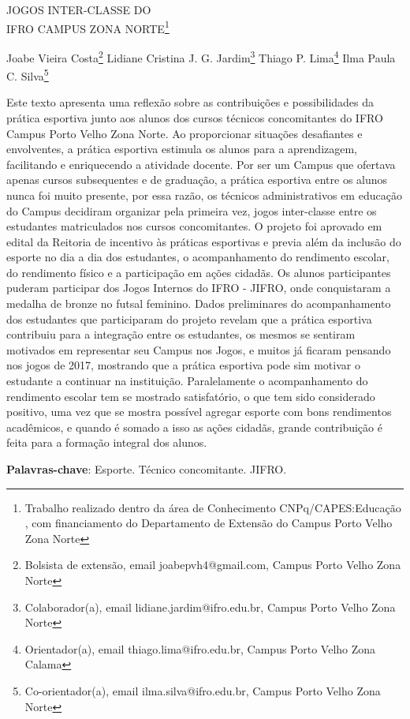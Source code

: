 \documentclass[article,12pt,onesidea,4paper,english,brazil]{abntex2}
\begin{document}
	
	
	\frenchspacing 
	
	\begin{center}
		\LARGE JOGOS INTER-CLASSE DO\\IFRO CAMPUS ZONA NORTE\footnote{Trabalho realizado dentro da área de Conhecimento CNPq/CAPES:Educação , com financiamento do Departamento de Extensão do Campus Porto Velho Zona Norte}
		
		\normalsize
		Joabe Vieira Costa\footnote{Bolsista de extensão, email joabepvh4@gmail.com, Campus Porto Velho Zona Norte} 
		Lidiane Cristina J. G. Jardim\footnote{Colaborador(a), email lidiane.jardim@ifro.edu.br, Campus Porto Velho Zona Norte} 
		Thiago P. Lima\footnote{Orientador(a), email thiago.lima@ifro.edu.br, Campus Porto Velho Zona Calama} 
		Ilma Paula C. Silva\footnote{Co-orientador(a), email ilma.silva@ifro.edu.br, Campus Porto Velho Zona Norte} 
	\end{center}
	
	\noindent Este texto apresenta uma reflexão sobre as contribuições e possibilidades da prática esportiva junto aos alunos dos cursos técnicos concomitantes do IFRO Campus Porto Velho Zona Norte. Ao proporcionar situações desafiantes e envolventes, a prática esportiva estimula os alunos para a aprendizagem, facilitando e enriquecendo a atividade docente. Por ser um Campus que ofertava apenas cursos subsequentes e de graduação, a prática esportiva entre os alunos nunca foi muito presente, por essa razão, os técnicos administrativos em educação do Campus decidiram organizar pela primeira vez, jogos inter-classe entre os estudantes matriculados nos cursos concomitantes. O projeto foi aprovado em edital da Reitoria de incentivo às práticas esportivas e previa além da inclusão do esporte no dia a dia dos estudantes, o acompanhamento do rendimento escolar, do rendimento físico e a participação em ações cidadãs. Os alunos participantes puderam participar dos Jogos Internos do IFRO - JIFRO, onde conquistaram a medalha de bronze no futsal feminino. Dados preliminares do acompanhamento dos estudantes que participaram do projeto revelam que a prática esportiva contribuiu para a integração entre os estudantes, os mesmos se sentiram motivados em representar seu Campus nos Jogos, e muitos já ficaram pensando nos jogos de 2017, mostrando que a prática esportiva pode sim motivar o estudante a continuar na instituição. Paralelamente o acompanhamento do rendimento escolar tem se mostrado satisfatório, o que tem sido considerado positivo, uma vez que se mostra possível agregar esporte com bons rendimentos acadêmicos, e quando é somado a isso as ações cidadãs, grande contribuição é feita para a formação integral dos alunos.
	
	\vspace{\onelineskip}
	
	\noindent
	\textbf{Palavras-chave}: Esporte. Técnico concomitante. JIFRO.
	
\end{document}
